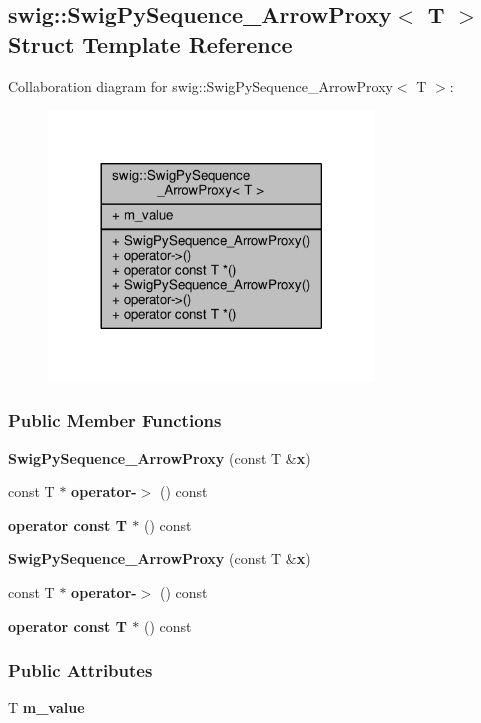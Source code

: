 \subsection{swig\+:\+:Swig\+Py\+Sequence\+\_\+\+Arrow\+Proxy$<$ T $>$ Struct Template Reference}
\label{structswig_1_1SwigPySequence__ArrowProxy}


Collaboration diagram for swig\+:\+:Swig\+Py\+Sequence\+\_\+\+Arrow\+Proxy$<$ T $>$\+:
\nopagebreak
\begin{figure}[H]
\begin{center}
\leavevmode
\includegraphics[width=245pt]{dc/da6/structswig_1_1SwigPySequence__ArrowProxy__coll__graph}
\end{center}
\end{figure}
\subsubsection*{Public Member Functions}
\begin{DoxyCompactItemize}
\item 
{\bf Swig\+Py\+Sequence\+\_\+\+Arrow\+Proxy} (const T \&{\bf x})
\item 
const T $\ast$ {\bf operator-\/$>$} () const 
\item 
{\bf operator const T $\ast$} () const 
\item 
{\bf Swig\+Py\+Sequence\+\_\+\+Arrow\+Proxy} (const T \&{\bf x})
\item 
const T $\ast$ {\bf operator-\/$>$} () const 
\item 
{\bf operator const T $\ast$} () const 
\end{DoxyCompactItemize}
\subsubsection*{Public Attributes}
\begin{DoxyCompactItemize}
\item 
T {\bf m\+\_\+value}
\end{DoxyCompactItemize}


